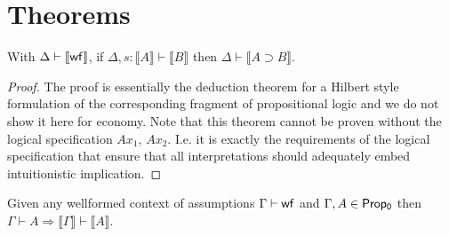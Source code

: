 \chapter{Theorems}

\begin{theorem}
	\label{deduct}
With $\Delta\vdash \llbracket\sf wf\rrbracket$, if $\Delta, s:\llbracket   A\rrbracket \vdash\llbracket B \rrbracket $ then $\Delta \vdash\llbracket   A \supset B \rrbracket $. 
\end{theorem}
\begin{proof}
The proof is essentially the deduction theorem for a Hilbert style formulation of the corresponding fragment of  propositional logic and we do not show it here for economy. Note that this theorem cannot be proven without the logical specification {\sf $Ax_1$, $Ax_2$}. I.e. it is exactly the requirements of the logical specification that ensure that all  interpretations  should adequately embed intuitionistic implication.
\end{proof}
\begin{lemma}
\label{bracklift}
Given any wellformed context of assumptions $\Gamma \vdash {\sf wf}$ and $\Gamma,  A \in {\sf Prop_0}$ then $\Gamma\vdash   A \Longrightarrow \llbracket \Gamma\rrbracket \vdash \llbracket   A \rrbracket$. 
\end{lemma}

